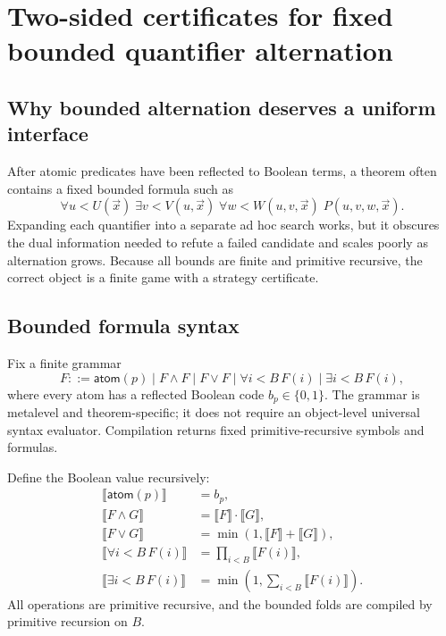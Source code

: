 \section{Two-sided certificates for fixed bounded quantifier alternation}\label{sec:bounded-strategies}

\subsection{Why bounded alternation deserves a uniform interface}

After atomic predicates have been reflected to Boolean terms, a theorem often contains a fixed bounded formula such as
\[
  \forall u<U(\vec x)\;\exists v<V(u,\vec x)\;
  \forall w<W(u,v,\vec x)\; P(u,v,w,\vec x).
\]
Expanding each quantifier into a separate ad hoc search works, but it obscures the dual information needed to refute a failed candidate and scales poorly as alternation grows.  Because all bounds are finite and primitive recursive, the correct object is a finite game with a strategy certificate.

\subsection{Bounded formula syntax}

Fix a finite grammar
\[
 F ::= \mathsf{atom}(p)\mid F\wedge F\mid F\vee F
       \mid \forall i<B\,F(i)\mid \exists i<B\,F(i),
\]
where every atom has a reflected Boolean code \(b_p\in\{0,1\}\).  The grammar is metalevel and theorem-specific; it does not require an object-level universal syntax evaluator.  Compilation returns fixed primitive-recursive symbols and formulas.

Define the Boolean value recursively:
\begin{align*}
 \llbracket\mathsf{atom}(p)\rrbracket &= b_p,\\
 \llbracket F\wedge G\rrbracket &= \llbracket F\rrbracket\cdot\llbracket G\rrbracket,\\
 \llbracket F\vee G\rrbracket &= \min(1,\llbracket F\rrbracket+\llbracket G\rrbracket),\\
 \llbracket\forall i<B\,F(i)\rrbracket &= \prod_{i<B}\llbracket F(i)\rrbracket,\\
 \llbracket\exists i<B\,F(i)\rrbracket &= \min\left(1,\sum_{i<B}\llbracket F(i)\rrbracket\right).
\end{align*}
All operations are primitive recursive, and the bounded folds are compiled by primitive recursion on \(B\).

